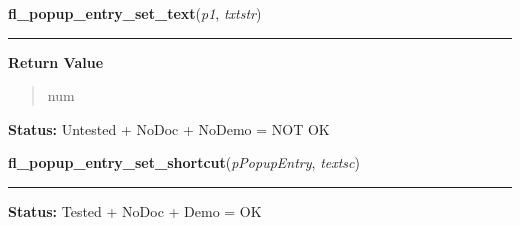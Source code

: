     \label{xformslib:library:fl_popup_entry_set_text}

    \vspace{0.5ex}

\hspace{.8\funcindent}\begin{boxedminipage}{\funcwidth}

    \raggedright \textbf{fl\_popup\_entry\_set\_text}(\textit{p1}, \textit{txtstr})

    \vspace{-1.5ex}

    \rule{\textwidth}{0.5\fboxrule}
\setlength{\parskip}{2ex}
\setlength{\parskip}{1ex}
      \textbf{Return Value}
    \vspace{-1ex}

      \begin{quote}
      num

      \end{quote}

\textbf{Status:} Untested + NoDoc + NoDemo = NOT OK



    \end{boxedminipage}

    \label{xformslib:library:fl_popup_entry_set_shortcut}

    \vspace{0.5ex}

\hspace{.8\funcindent}\begin{boxedminipage}{\funcwidth}

    \raggedright \textbf{fl\_popup\_entry\_set\_shortcut}(\textit{pPopupEntry}, \textit{textsc})

    \vspace{-1.5ex}

    \rule{\textwidth}{0.5\fboxrule}
\setlength{\parskip}{2ex}
\setlength{\parskip}{1ex}
\textbf{Status:} Tested + NoDoc + Demo = OK



    \end{boxedminipage}

    \label{xformslib:library:fl_popup_entry_set_value}

